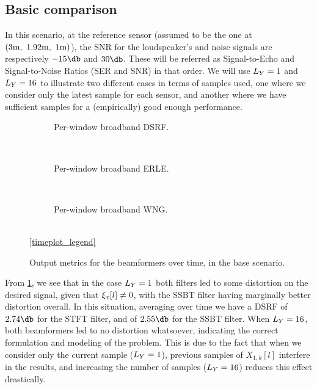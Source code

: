 \subsection{Basic comparison}
In this scenario, at the reference sensor (assumed to be the one at $(3\si{\meter},~1.92\si{\meter},~1\si{\meter})$), the SNR for the loudspeaker's and noise signals are respectively $-15\dB$ and $30\dB$. These will be referred as Signal-to-Echo and Signal-to-Noise Ratios (SER and SNR) in that order. We will use $\Ly = 1$ and $\Ly = 16$ to illustrate two different cases in terms of samples used, one where we consider only the latest sample for each sensor, and another where we have sufficient samples for a (empirically) good enough performance.


\begin{figure}[!ht]
	\centering
	\begin{subfigure}{\textwidth}
		\centering
		
		\caption{Per-window broadband DSRF.}
		\label{subfig:lineplot__DSRF_l__iSER_n15__err_0}
	\end{subfigure}\\[1em]
	\begin{subfigure}{\textwidth}
		\centering
		
		\caption{Per-window broadband ERLE.}
		\label{subfig:lineplot__ERLE_l__iSER_n15__err_0}
	\end{subfigure}\\[1em]
	\begin{subfigure}{\textwidth}
		\centering
		
		\caption{Per-window broadband WNG.}
		\label{subfig:lineplot__WNG_l__iSER_n15__err_0}
	\end{subfigure}\\[1em]
	\ref*{timeplot_legend}
	\caption{Output metrics for the beamformers over time, in the base scenario.}
	\label{fig:lineplot__iSER_n15__Ly_1__err_0}
\end{figure}


From \cref{subfig:lineplot__DSRF_l__iSER_n15__err_0}, we see that in the case $\Ly = 1$ both filters led to some distortion on the desired signal, given that $\xi_{x}[l] \neq 0$, with the SSBT filter having marginally better distortion overall. In this situation, averaging over time we have a DSRF of $2.74 \dB$ for the STFT filter, and of $2.55 \dB$ for the SSBT filter. When $\Ly = 16$, both beamformers led to no distortion whatsoever, indicating the correct formulation and modeling of the problem. This is due to the fact that when we consider only the current sample ($\Ly = 1$), previous samples of $X_{1,k}[l]$ interfere in the results, and increasing the number of samples ($\Ly = 16$) reduces this effect drastically.

